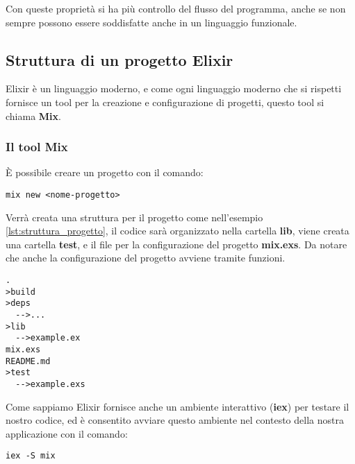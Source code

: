 Con queste proprietà si ha più controllo del flusso del programma,
anche se non sempre possono essere soddisfatte anche in un linguaggio
funzionale.


\subsection{Struttura di un progetto Elixir}

Elixir è un linguaggio moderno, e come ogni linguaggio moderno che
si rispetti fornisce un tool per la creazione e configurazione di
progetti, questo tool si chiama \textbf{Mix}.


\subsubsection{Il tool Mix}
È possibile creare un progetto con il comando:

\begin{lstlisting}[language=none]
mix new <nome-progetto>
\end{lstlisting}

Verrà creata una struttura per il progetto come nell'esempio \ref{lst:struttura_progetto},
il codice sarà organizzato nella cartella \textbf{lib}, viene creata una
cartella \textbf{test}, e il file per la configurazione del progetto \textbf{mix.exs}.
Da notare che anche la configurazione del progetto avviene tramite funzioni.

\begin{lstlisting}[language=none,captionpos=b,caption={Struttura progetto},label={lst:struttura_progetto}]
.
>build
>deps
  -->...
>lib
  -->example.ex
mix.exs
README.md
>test
  -->example.exs
\end{lstlisting}

Come sappiamo Elixir fornisce anche un ambiente interattivo (\textbf{iex}) per
testare il nostro codice, ed è consentito avviare questo ambiente nel
contesto della nostra applicazione con il comando:

\begin{lstlisting}[language=none]
iex -S mix 
\end{lstlisting}

